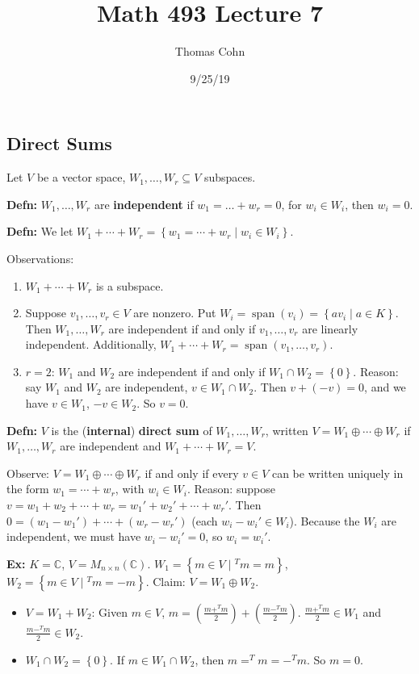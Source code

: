 \documentclass[10pt,letterpaper]{article}
\author{Thomas Cohn}
\title{Math 493 Lecture 7}
\date{9/25/19} %
\newcommand{\n}{\hfill\break}
\newcommand{\hangblock}[2]{\par\noindent\settowidth{\hangindent}{\textbf{#1: }}\textbf{#1: }\!\!\!#2}
\newcommand{\defn}[1]{\hangblock{Defn}{#1}}
\newcommand{\ex}[1]{\hangblock{Ex}{#1}}
\newcommand{\set}[1]{\left\{#1\right\}}
\newcommand{\complex}{\mathbb{C}}
\newcommand{\C}{\complex}
\newcommand{\tpose}{^{T}\!}
\DeclareMathOperator{\vspan}{span}
\newcommand{\paren}[1]{\left(#1\right)}
\begin{document}
\maketitle
\setlength\RaggedRightParindent{\parindent}
\RaggedRight

\subsection*{Direct Sums}

\par\noindent
Let $V$ be a vector space, $W_{1},\ldots,W_{r}\subseteq{}V$ subspaces.\n

\defn{
	$W_{1},\ldots,W_{r}$ are \textbf{independent} if $w_{1}=\ldots+w_{r}=0$, for $w_{i}\in{}W_{i}$, then $w_{i}=0$.\n
}

\defn{
	We let $W_{1}+\cdots+W_{r}=\set{w_{1}=\cdots+w_{r}\mid{}w_{i}\in{}W_{i}}$.\n
}

\par\noindent
Observations:
\begin{enumerate}
	\item $W_{1}+\cdots+W_{r}$ is a subspace.
	\item Suppose $v_{1},\ldots,v_{r}\in{}V$ are nonzero. Put $W_{i}=\vspan(v_{i})=\set{av_{i}\mid{}a\in{}K}$. Then $W_{1},\ldots,W_{r}$ are independent if and only if $v_{1},\ldots,v_{r}$ are linearly independent. Additionally, $W_{1}+\cdots+W_{r}=\vspan(v_{1},\ldots,v_{r})$.
	\item $r=2$: $W_{1}$ and $W_{2}$ are independent if and only if $W_{1}\cap{}W_{2}=\set{0}$.\n
	Reason: say $W_{1}$ and $W_{2}$ are independent, $v\in{}W_{1}\cap{}W_{2}$. Then $v+(-v)=0$, and we have $v\in{}W_{1}$, $-v\in{}W_{2}$. So $v=0$.
\end{enumerate}

\defn{
	$V$ is the (\textbf{internal}) \textbf{direct sum} of $W_{1},\ldots,W_{r}$, written $V=W_{1}\oplus\cdots\oplus{}W_{r}$ if $W_{1},\ldots,W_{r}$ are independent and $W_{1}+\cdots+W_{r}=V$.\n
}

\par\noindent
Observe: $V=W_{1}\oplus\cdots\oplus{}W_{r}$ if and only if every $v\in{}V$ can be written uniquely in the form $w_{1}=\cdots+w_{r}$, with $w_{i}\in{}W_{i}$.\n
Reason: suppose $v=w_{1}+w_{2}+\cdots+w_{r}=w_{1}'+w_{2}'+\cdots+w_{r}'$. Then $0=(w_{1}-w_{1}')+\cdots+(w_{r}-w_{r}')$ (each $w_{i}-w_{i}'\in{}W_{i}$). Because the $W_{i}$ are independent, we must have $w_{i}-w_{i}'=0$, so $w_{i}=w_{i}'$.\n

\ex{
	$K=\C$, $V=M_{n\times{}n}(\C)$. $W_{1}=\set{m\in{}V\mid{}\tpose{}m=m}$, $W_{2}=\set{m\in{}V\mid{}\tpose{}m=-m}$.\n
	Claim: $V=W_{1}\oplus{}W_{2}$.
	\begin{itemize}
		\item $V=W_{1}+W_{2}$: Given $m\in{}V$, $m=\paren{\frac{m+\tpose{}m}{2}}+\paren{\frac{m-\tpose{}m}{2}}$. $\frac{m+\tpose{}m}{2}\in{}W_{1}$ and $\frac{m-\tpose{}m}{2}\in{}W_{2}$.
		\item $W_{1}\cap{}W_{2}=\set{0}$. If $m\in{}W_{1}\cap{}W_{2}$, then $m=\tpose{}m=-\tpose{}m$. So $m=0$.
	\end{itemize}
}
\end{document}
